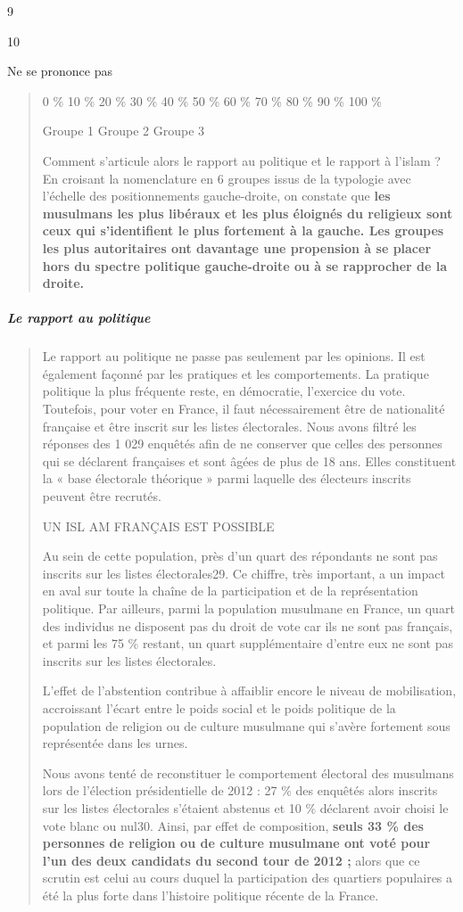 9

10

Ne se prononce pas

\begin{quote}
0 \% 10 \% 20 \% 30 \% 40 \% 50 \% 60 \% 70 \% 80 \% 90 \% 100 \%

Groupe 1 Groupe 2 Groupe 3

Comment s'articule alors le rapport au politique et le rapport à l'islam
? En croisant la nomenclature en 6 groupes issus de la typologie avec
l'échelle des positionnements gauche-droite, on constate que \textbf{les
musulmans les plus libéraux et les plus éloignés du religieux sont ceux
qui s'identifient le plus fortement à la gauche. Les groupes les plus
autoritaires ont davantage une propension à se placer hors du spectre
politique gauche-droite ou à se rapprocher de la droite.}
\end{quote}

\hypertarget{le-rapport-au-politique}{%
\subparagraph{Le rapport au politique}\label{le-rapport-au-politique}}

\begin{quote}
Le rapport au politique ne passe pas seulement par les opinions. Il est
également façonné par les pratiques et les comportements. La pratique
politique la plus fréquente reste, en démocratie, l'exercice du vote.
Toutefois, pour voter en France, il faut nécessairement être de
nationalité française et être inscrit sur les listes électorales. Nous
avons filtré les réponses des 1 029 enquêtés afin de ne conserver que
celles des personnes qui se déclarent françaises et sont âgées de plus
de 18 ans. Elles constituent la « base électorale théorique » parmi
laquelle des électeurs inscrits peuvent être recrutés.

UN ISL AM FRANÇAIS EST POSSIBLE

Au sein de cette population, près d'un quart des répondants ne sont pas
inscrits sur les listes électorales29. Ce chiffre, très important, a un
impact en aval sur toute la chaîne de la participation et de la
représentation politique. Par ailleurs, parmi la population musulmane en
France, un quart des individus ne disposent pas du droit de vote car ils
ne sont pas français, et parmi les 75 \% restant, un quart
supplémentaire d'entre eux ne sont pas inscrits sur les listes
électorales.

L'effet de l'abstention contribue à affaiblir encore le niveau de
mobilisation, accroissant l'écart entre le poids social et le poids
politique de la population de religion ou de culture musulmane qui
s'avère fortement sous représentée dans les urnes.

Nous avons tenté de reconstituer le comportement électoral des musulmans
lors de l'élection présidentielle de 2012 : 27 \% des enquêtés alors
inscrits sur les listes électorales s'étaient abstenus et 10 \%
déclarent avoir choisi le vote blanc ou nul30. Ainsi, par effet de
composition, \textbf{seuls 33 \% des personnes de religion ou de culture
musulmane ont voté pour l'un des deux candidats du second tour de 2012
;} alors que ce scrutin est celui au cours duquel la participation des
quartiers populaires a été la plus forte dans l'histoire politique
récente de la France.
\end{quote}

